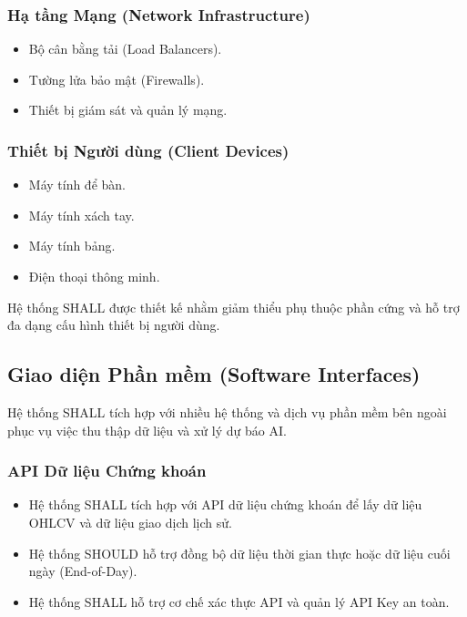 \documentclass[12pt, a4paper]{article}
\begin{document}
\subsubsection{Hạ tầng Mạng (Network Infrastructure)}
\begin{itemize}
    \item Bộ cân bằng tải (Load Balancers).

    \item Tường lửa bảo mật (Firewalls).

    \item Thiết bị giám sát và quản lý mạng.
\end{itemize}


\subsubsection{Thiết bị Người dùng (Client Devices)}
\begin{itemize}
    \item Máy tính để bàn.

    \item Máy tính xách tay.

    \item Máy tính bảng.

    \item Điện thoại thông minh.
\end{itemize}

Hệ thống SHALL được thiết kế nhằm giảm thiểu phụ thuộc phần cứng và hỗ trợ đa dạng cấu hình thiết bị người dùng.


\subsection{Giao diện Phần mềm (Software Interfaces)}

Hệ thống SHALL tích hợp với nhiều hệ thống và dịch vụ phần mềm bên ngoài phục vụ việc thu thập dữ liệu và xử lý dự báo AI.


\subsubsection{API Dữ liệu Chứng khoán}
\begin{itemize}
    \item Hệ thống SHALL tích hợp với API dữ liệu chứng khoán để lấy dữ liệu OHLCV và dữ liệu giao dịch lịch sử.

    \item Hệ thống SHOULD hỗ trợ đồng bộ dữ liệu thời gian thực hoặc dữ liệu cuối ngày (End-of-Day).

    \item Hệ thống SHALL hỗ trợ cơ chế xác thực API và quản lý API Key an toàn.
\end{itemize}
\end{document}
